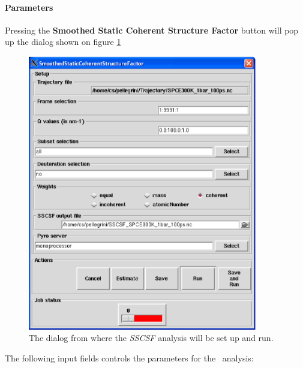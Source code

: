 \documentclass[a4paper,11pt]{report}
\begin{document}
\paragraph{Parameters\\}
\label{sscsf_parameters}
Pressing the \textbf{Smoothed Static Coherent Structure Factor} button will pop up the dialog shown on figure \ref{fig:sscsf}
\begin{figure}[h!]
\begin{center}
\includegraphics[width=10cm]{Figures/sscsf.eps}
\end{center}
\caption[The \textit{SSCSF} analysis dialog]{The dialog from where the \textit{SSCSF} analysis will be set up and run.}
\label{fig:sscsf}
\end{figure}   

The following input fields controls the parameters for the \SSCSF\ analysis:
\end{document}
